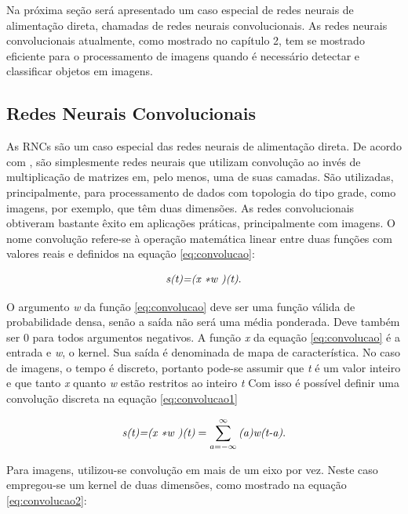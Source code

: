 \documentclass[
	12pt,				%
    oneside,			%
	a4paper,			%
	english,			%
	french,				%
	spanish,			%
	brazil,				%
	]{abntex2}
\begin{document}
Na próxima seção será apresentado um caso especial de redes neurais de alimentação direta, chamadas de redes neurais convolucionais. As redes neurais convolucionais atualmente, como mostrado no capítulo 2, tem se mostrado eficiente para o processamento de imagens quando é necessário detectar e classificar objetos em imagens.


\subsection{Redes Neurais Convolucionais}
As RNCs são um caso especial das redes neurais de alimentação direta. De acordo com  , são simplesmente redes neurais que utilizam convolução ao invés de multiplicação de matrizes em, pelo menos, uma de suas camadas. São utilizadas, principalmente, para processamento de dados com topologia do tipo grade, como imagens, por exemplo, que têm duas dimensões. As redes convolucionais obtiveram bastante êxito em aplicações práticas, principalmente com imagens. O nome convolução refere-se à operação matemática linear entre duas funções com valores reais e definidos na equação \ref{eq:convolucao}:

\begin{equation}
\centering
    \textit{s(t)=(x \textasteriskcentered w )(t)}.
    \label{eq:convolucao}
\end{equation}

O argumento \textit{w} da função \ref{eq:convolucao} deve ser uma função válida de probabilidade densa, senão a saída não será uma média ponderada. Deve também ser 0 para todos argumentos negativos. A função \textit{x} da equação \ref{eq:convolucao} é a entrada e \textit{w}, o kernel. Sua saída é denominada de mapa de característica. No caso de imagens, o tempo é discreto, portanto pode-se assumir que \textit{t} é um valor inteiro e que tanto \textit{x} quanto \textit{w} estão restritos ao inteiro \textit{t} Com isso é possível definir uma convolução discreta na equação \ref{eq:convolucao1}

\begin{equation}
\centering
    \textit{s(t)=(x \textasteriskcentered w )(t)} = \sum_{a=- \infty}^{\infty} \textit{(a)w(t-a)} .
    \label{eq:convolucao1}
\end{equation}

Para imagens, utilizou-se convolução em mais de um eixo por vez. Neste caso empregou-se um kernel de duas dimensões, como mostrado na equação \ref{eq:convolucao2}:
\end{document}
